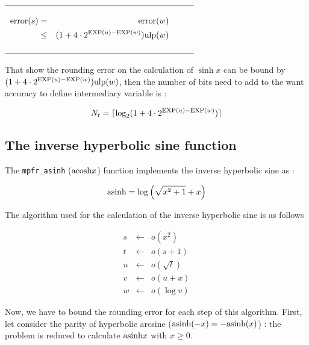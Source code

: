 \documentclass[12pt]{amsart}
\def\n{\textnormal}
\def\ulp{{\rm ulp}}
\def\Exp{{\rm EXP}}
\begin{document}
\begin{center}
\begin{tabular}{l l l}
\begin{minipage}{7.5cm}
\begin{center}
\begin{eqnarray}\nonumber
 {\textnormal{error}}(s) & = &  {\textnormal{error}}(w)\\\nonumber
 & \leq &  (1+ 4 \cdot 2^{\Exp(u)-\Exp(w)}) \ulp(w)
\end{eqnarray}



\end{center}

\end{minipage} &
\begin{minipage}{6cm}


\end{minipage}


\end{tabular}
\end{center}


That show the rounding error on the calculation of $\sinh x$ can be bound by $(1+ 4 \cdot 2^{\Exp(u)-\Exp(w)}) \ulp(w)$, then the number of bits need to add to the want accuracy to define intermediary variable is :

\[
N_t=\lceil \log_2(1+ 4 \cdot 2^{\Exp(u)-\Exp(w)}) \rceil
\]


\subsection{The inverse hyperbolic sine function}

The {\tt mpfr\_asinh} ($\n{acosh}{x}$) function implements the inverse hyperbolic sine as :

$$
\n{asinh} = \log \left( \sqrt{x^2+1} + x \right) 
$$

The algorithm used for the calculation of the inverse hyperbolic sine is as follows

\begin{eqnarray}\nonumber
s&\leftarrow&o(x^2)\\\nonumber
t&\leftarrow&o(s+1)\\\nonumber
u&\leftarrow&o(\sqrt{t})\\\nonumber
v&\leftarrow&o(u+x)\\\nonumber
w&\leftarrow&o(\log  v)
\end{eqnarray}


Now, we have to bound the rounding error for each step of this
algorithm.  First, let consider the parity of hyperbolic arcsine
($\n{asinh}(-x)=-\n{asinh}(x)$) : the problem is reduced to calculate $\n{asinh} x$
with $x \geq 0$.
\end{document}
